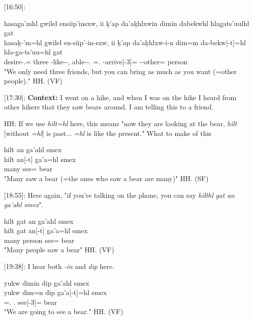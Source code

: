 [16:50]: 

\begin{exe}
    \ex \glll
    hasag̱a'mhl gwilel ensiip'insxw, ii ḵ'ap da'aḵhlxwin dimin dabekwhl hlag̱ats'uulhl gat\\
    hasaḵ-'m=hl gwilel en-siip'-in-sxw, ii ḵ'ap da'aḵhlxw-i-n dim=m da-bekw[-t]=hl hla-g̱a-ts'uu=hl gat \\
    desire-\Fpl{}.\Ii{}=\Cn{} three \Nmlz{}-like--\Antip{}, \Ccnj{} \Verum{} able-\Tr{}-\Ssg{}.\Ii{} \Prosp{}=\Ssg{}.\I{} \Com-arrive[-3]=\Cn{} \Part{}-\Distr{}-other=\Cn{} person \\
    \glt "We only need three friends, but you can bring as much as you want (=other people)." \hfill HH.\ElicitationDate{} (VF)
\end{exe}

[17:30]: \textbf{Context: }I went on a hike, and when I was on the hike I heard from other hikers that they saw bears around. I am telling this to a friend.

HH: If we use \textit{hilt=hl} here, this means "now they are looking at the bear, \textit{hilt} [without \textit{=hl}] is past... \textit{=hl} is like the present." What to make of this

\begin{exe}
    \ex \glll
    hilt an ga'ahl smex \\
    hilt an[-t] ga'a=hl smex\\
    many \Ax[-3] see=\Cn{} bear\\
    \glt "Many saw a bear (=the ones who saw a bear are many)" \hfill HH.\ElicitationDate{} (SF)
\end{exe}

[18:55]: Here again, "if you're talking on the phone, you can say \textit{hilthl gat an ga'ahl smex}".

\begin{exe}
    \ex \glll
    hilt gat an ga'ahl smex \\
    hilt gat an[-t] ga'a=hl smex\\
    many person \Ax[-3] see=\Cn{} bear\\
    \glt "Many people saw a bear" \hfill HH.\ElicitationDate{} (VF)
\end{exe}


[19:38]: I hear both \textit{-in} and \textit{dip} here.

\begin{exe}
    \ex \glll
    yukw dimin dip ga'ahl smex\\
    yukw dim=n dip ga'a[-t]=hl smex \\
    \Prog{} \Prosp{}=\Fpl{}.\I{} \Fpl{}.\I{} see[-3]=\Cn{} bear\\
    \glt "We are going to see a bear." \hfill HH.\ElicitationDate{} (VF)
\end{exe}

